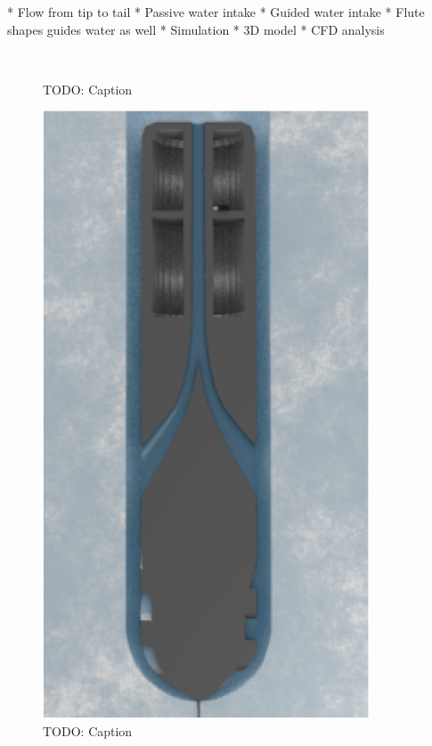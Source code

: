 * Flow from tip to tail
* Passive water intake
	* Guided water intake
	* Flute shapes guides water as well
* Simulation
	* 3D model
	* CFD analysis

\begin{figure}[htb]
	\centering
	\\
	\caption{TODO: Caption}
	\label{fig:3d_model}
\end{figure}

\begin{figure}[htb]
	\centering
	\includegraphics[width=.5\textwidth]{figures/convection/water_transportation}
	\caption{TODO: Caption}
	\label{fig:water_transportation}
\end{figure}

